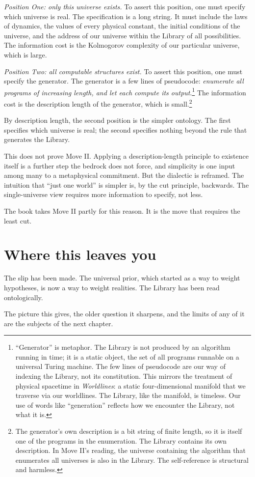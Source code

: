 \emph{Position One: only this universe exists.} To assert this position, one must specify which universe is real. The specification is a long string. It must include the laws of dynamics, the values of every physical constant, the initial conditions of the universe, and the address of our universe within the Library of all possibilities. The information cost is the Kolmogorov complexity of our particular universe, which is large.

\emph{Position Two: all computable structures exist.} To assert this position, one must specify the generator. The generator is a few lines of pseudocode: \emph{enumerate all programs of increasing length, and let each compute its output}.\footnote{``Generator'' is metaphor. The Library is not produced by an algorithm running in time; it is a static object, the set of all programs runnable on a universal Turing machine. The few lines of pseudocode are our way of indexing the Library, not its constitution. This mirrors the treatment of physical spacetime in \textit{Worldlines}: a static four-dimensional manifold that we traverse via our worldlines. The Library, like the manifold, is timeless. Our use of words like ``generation'' reflects how we encounter the Library, not what it is.} The information cost is the description length of the generator, which is small.\footnote{The generator's own description is a bit string of finite length, so it is itself one of the programs in the enumeration. The Library contains its own description. In Move II's reading, the universe containing the algorithm that enumerates all universes is also in the Library. The self-reference is structural and harmless.}

By description length, the second position is the simpler ontology. The first specifies which universe is real; the second specifies nothing beyond the rule that generates the Library.

This does not prove Move II. Applying a description-length principle to existence itself is a further step the bedrock does not force, and simplicity is one input among many to a metaphysical commitment. But the dialectic is reframed. The intuition that ``just one world'' is simpler is, by the cut principle, backwards. The single-universe view requires more information to specify, not less.

The book takes Move II partly for this reason. It is the move that requires the least cut.

\section*{Where this leaves you}

The slip has been made. The universal prior, which started as a way to weight hypotheses, is now a way to weight realities. The Library has been read ontologically.

The picture this gives, the older question it sharpens, and the limits of any of it are the subjects of the next chapter.
